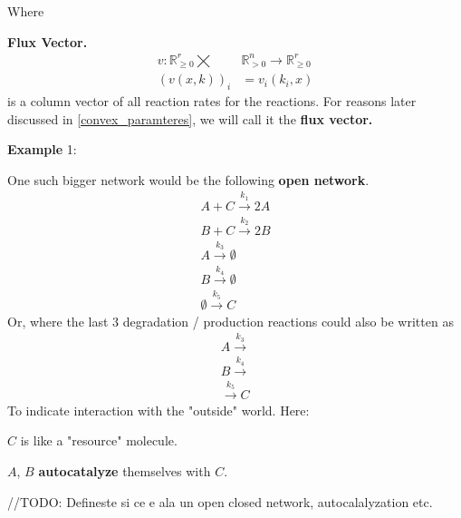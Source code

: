 Where
\begin{definition}\label{flux_vector}
	\textbf{Flux Vector.}
	\begin{align}
		v : \mathbb{R}^r_{\geq 0}  \bigtimes &\mathbb{R}^n_{> 0} \rightarrow \mathbb{R}^r_{\geq 0}  \nonumber \\
		(v(x,k))_{i} &= v_i(k_i, x)
	\end{align}
	is a column vector of all reaction rates for the reactions. For reasons later discussed in \ref{convex_paramteres}, we will call it the \textbf{flux vector.}
\end{definition}

\textbf{Example}\label{network_example1} 1:

One such bigger network would be the following \textbf{open network}.
\begin{align*}
	A + C \xrightarrow{k_{1}} 2A \\
	B + C \xrightarrow{k_{2}} 2B  \\
	A \xrightarrow{k_{3}} \emptyset \\
	B \xrightarrow{k_{4}} \emptyset \\
	\emptyset \xrightarrow{k_{5}} C
\end{align*}
Or, where the last $3$ degradation / production reactions could also be written as
\begin{align*}
	A \xrightarrow{k_{3}} \\
	B \xrightarrow{k_{4}} \\
	\xrightarrow{k_{5}} C	
\end{align*}
To indicate interaction with the "outside" world.
Here: 	

$C$ is like a "resource" molecule.

$A$, $B$ \textbf{autocatalyze} themselves with $C$.

\hfill\break
//TODO: Defineste si ce e ala un open closed network, autocalalyzation etc.
\hfill\break

